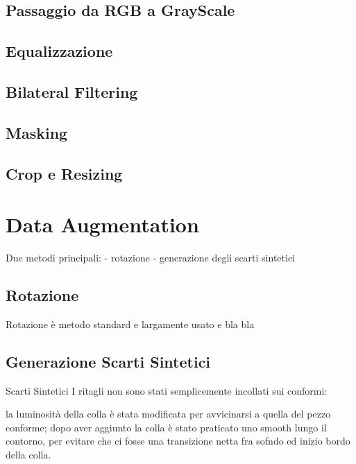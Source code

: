 \subsection {Passaggio da RGB a GrayScale}
\subsection {Equalizzazione}
\subsection {Bilateral Filtering}
\subsection {Masking}
\subsection {Crop e Resizing}







\section {Data Augmentation}
Due metodi principali:
 - rotazione
 - generazione degli scarti sintetici

\subsection {Rotazione}
Rotazione è metodo standard e largamente usato e bla bla

\subsection {Generazione Scarti Sintetici}


Scarti Sintetici
 I ritagli non sono stati semplicemente incollati sui conformi:

 la luminosità della colla è stata modificata per avvicinarsi a quella del pezzo conforme;
 dopo aver aggiunto la colla è stato praticato uno smooth lungo il contorno, per evitare che ci fosse una transizione netta fra sofndo ed inizio bordo della colla.







































